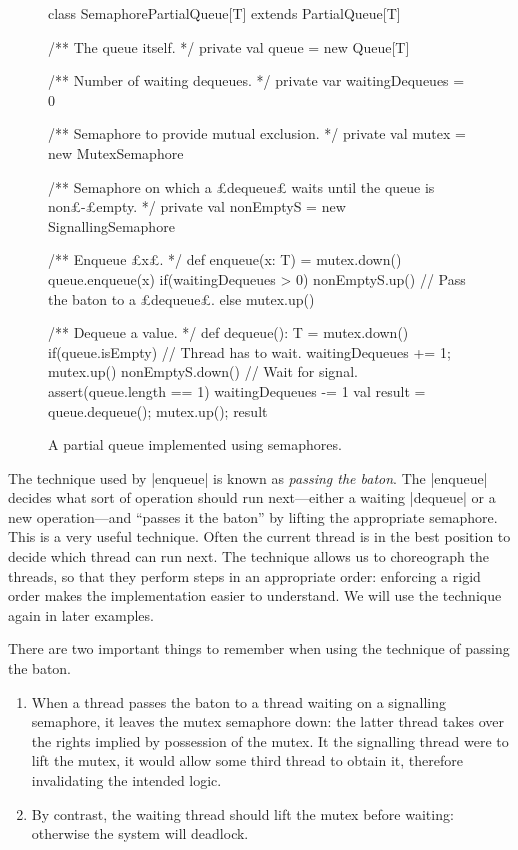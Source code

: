
\begin{figure}
\begin{scala}
class SemaphorePartialQueue[T] extends PartialQueue[T]{
  /** The queue itself. */
  private val queue = new Queue[T]

  /** Number of waiting dequeues. */
  private var waitingDequeues = 0

  /** Semaphore to provide mutual exclusion. */
  private val mutex = new MutexSemaphore

  /** Semaphore on which a £dequeue£ waits until the queue is non£-£empty. */
  private val nonEmptyS = new SignallingSemaphore

  /** Enqueue £x£. */
  def enqueue(x: T) = {
    mutex.down()
    queue.enqueue(x)
    if(waitingDequeues > 0) nonEmptyS.up() // Pass the baton to a £dequeue£.
    else mutex.up()
  }

  /** Dequeue a value. */
  def dequeue(): T = {
    mutex.down()
    if(queue.isEmpty){  // Thread has to wait.
      waitingDequeues += 1; mutex.up()
      nonEmptyS.down() // Wait for signal.
      assert(queue.length == 1)
      waitingDequeues -= 1
    }
    val result = queue.dequeue(); mutex.up(); result
  }
}
\end{scala}
\caption{A partial queue implemented using semaphores.}
\label{fig:SemaphorePartialQueue}
\end{figure}




The technique used by |enqueue| is known as \emph{passing the
  baton}.  The
|enqueue| decides what sort of operation should run next---either a waiting
|dequeue| or a new operation---and ``passes it the baton'' by lifting the
appropriate semaphore.  This is a very useful technique.  Often the current
thread is in the best position to decide which thread can run next.  The
technique allows us to choreograph the threads, so that they perform steps in
an appropriate order: enforcing a rigid order makes the implementation easier
to understand.  We will use the technique again in later examples.

There are two important things to remember when using the technique of passing
the baton.
%
\begin{enumerate}
\item
When a thread passes the baton to a thread waiting on a signalling semaphore,
it leaves the mutex semaphore down: the latter thread takes over the rights
implied by possession of the mutex.  It the signalling thread were to lift the
mutex, it would allow some third thread to obtain it, therefore invalidating
the intended logic.

\item
By contrast, the waiting thread should lift the mutex before waiting:
otherwise the system will deadlock.
\end{enumerate}

